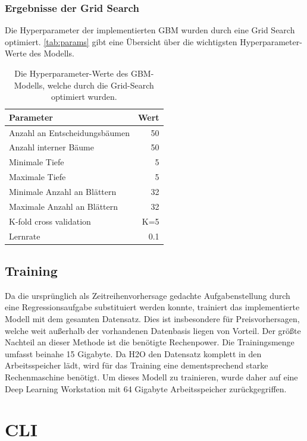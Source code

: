 \documentclass[
ngerman          %
,a4paper          %
,11pt
,pdftex
]{report}
\begin{document}
\subsubsection*{Ergebnisse der Grid Search}
Die Hyperparameter der implementierten GBM wurden durch eine Grid Search optimiert. \autoref{tab:params} gibt eine Übersicht über die wichtigsten Hyperparameter-Werte des Modells.

\begin{table}[h]
	\centering
	\begin{tabular}{l r}
		\textbf{Parameter} & \textbf{Wert} \\ 
		\hline \hline
		Anzahl an Entscheidungsbäumen & 50 \\ 
		Anzahl interner Bäume & 50  \\
		Minimale Tiefe & 5 \\
        Maximale Tiefe & 5\\
        Minimale Anzahl an Blättern & 32 \\
        Maximale Anzahl an Blättern & 32 \\
        K-fold cross validation & K=5 \\
        Lernrate & 0.1 \\
		\hline 
	\end{tabular}
	\caption{Die Hyperparameter-Werte des GBM-Modells, welche durch die Grid-Search optimiert wurden.}
	\label{tab:params}	
\end{table} 

\subsection{Training}
Da die ursprünglich als Zeitreihenvorhersage gedachte Aufgabenstellung durch eine Regressionsaufgabe substituiert werden konnte, trainiert das implementierte Modell mit dem gesamten Datensatz. Dies ist insbesondere für Preisvorhersagen, welche weit außerhalb der vorhandenen Datenbasis liegen von Vorteil. Der größte Nachteil an dieser Methode ist die benötigte Rechenpower. Die Trainingsmenge umfasst beinahe 15 Gigabyte. Da H2O den Datensatz komplett in den Arbeitsspeicher lädt, wird für das Training eine dementsprechend starke Rechenmaschine benötigt. Um dieses Modell zu trainieren, wurde daher auf eine Deep Learning Workstation mit 64 Gigabyte Arbeitsspeicher zurückgegriffen.\\
\par

\section{CLI}
\end{document}

